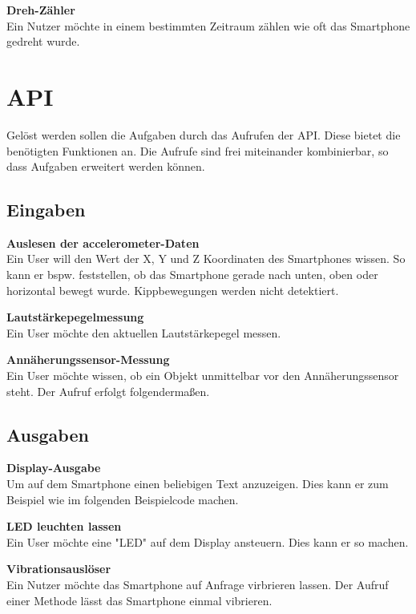 \documentclass[11pt,a4paper]{report}
\begin{document}
\textbf{Dreh-Zähler}\\
Ein Nutzer möchte in einem bestimmten Zeitraum zählen wie oft das Smartphone gedreht wurde.



\section*{API}
Gelöst werden sollen die Aufgaben durch das Aufrufen der API.
Diese bietet die benötigten Funktionen an.
Die Aufrufe sind frei miteinander kombinierbar, so dass Aufgaben erweitert werden können.

\subsection*{Eingaben}

\textbf{Auslesen der accelerometer-Daten}\\
Ein User will den Wert der X, Y und Z Koordinaten des Smartphones wissen.
So kann er bspw. feststellen, ob das Smartphone gerade nach unten, oben oder horizontal bewegt wurde.
Kippbewegungen werden nicht detektiert.


\textbf{Lautstärkepegelmessung}\\
Ein User möchte den aktuellen Lautstärkepegel messen.


\textbf{Annäherungssensor-Messung}\\
Ein User möchte wissen, ob ein Objekt unmittelbar vor den Annäherungssensor steht.
Der Aufruf erfolgt folgendermaßen.


\subsection*{Ausgaben}

\textbf{Display-Ausgabe}\\
Um auf dem Smartphone einen beliebigen Text anzuzeigen.
Dies kann er zum Beispiel wie im folgenden Beispielcode machen.


\textbf{LED leuchten lassen}\\
Ein User möchte eine "LED" auf dem Display ansteuern.
Dies kann er so machen.


\textbf{Vibrationsauslöser}\\
Ein Nutzer möchte das Smartphone auf Anfrage virbrieren lassen.
Der Aufruf einer Methode lässt das Smartphone einmal vibrieren.

\end{document}

